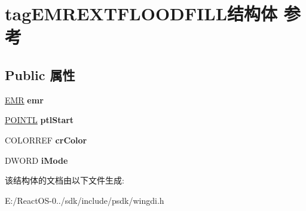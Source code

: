 \hypertarget{structtag_e_m_r_e_x_t_f_l_o_o_d_f_i_l_l}{}\section{tag\+E\+M\+R\+E\+X\+T\+F\+L\+O\+O\+D\+F\+I\+L\+L结构体 参考}
\label{structtag_e_m_r_e_x_t_f_l_o_o_d_f_i_l_l}
\subsection*{Public 属性}
\begin{DoxyCompactItemize}
\item 
\mbox{\label{structtag_e_m_r_e_x_t_f_l_o_o_d_f_i_l_l_af6aef93094d37a4eca64be20eab901c3}} 
\hyperlink{structtag_e_m_r}{E\+MR} {\bfseries emr}
\item 
\mbox{\label{structtag_e_m_r_e_x_t_f_l_o_o_d_f_i_l_l_a2597eb8fddd6a24ab7a91e6b76b2208b}} 
\hyperlink{struct___p_o_i_n_t_l}{P\+O\+I\+N\+TL} {\bfseries ptl\+Start}
\item 
\mbox{\label{structtag_e_m_r_e_x_t_f_l_o_o_d_f_i_l_l_a078df80d637cce39d07f099e583189c1}} 
C\+O\+L\+O\+R\+R\+EF {\bfseries cr\+Color}
\item 
\mbox{\label{structtag_e_m_r_e_x_t_f_l_o_o_d_f_i_l_l_a15ed3658f501844a28ac2d73542c248c}} 
D\+W\+O\+RD {\bfseries i\+Mode}
\end{DoxyCompactItemize}


该结构体的文档由以下文件生成\+:\begin{DoxyCompactItemize}
\item 
E\+:/\+React\+O\+S-\/0../sdk/include/psdk/wingdi.\+h\end{DoxyCompactItemize}
